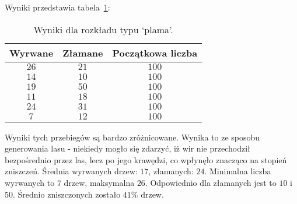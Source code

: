 Wyniki przedstawia tabela~\ref{tab:sym3}:

 \begin{table}[h!]
 \caption{Wyniki dla rozkładu typu `plama'.}
 \label{tab:sym3}
 \begin{center}
\begin{tabular} {|c|c|c|}
\hline
Wyrwane & Złamane & Początkowa liczba \\ \hline \hline
$26$ 	& $21$ 	&	$100$ \\ \hline
$14$ 	& $10$ 	&	$100$ \\ \hline
$19$ 	& $50$ 	&	$100$ \\ \hline
$11$ 	& $18$ 	&	$100$ \\ \hline
$24$ 	& $31$ 	&	$100$ \\ \hline
$7$ 	& $12$ 	&	$100$ \\ \hline
\end{tabular}
\end{center}
\end{table}

Wyniki tych przebiegów są bardzo zróżnicowane. Wynika to ze sposobu generowania lasu - niekiedy mogło się zdarzyć, iż wir nie przechodził bezpośrednio przez las, lecz po jego krawędzi, co wpłynęło znacząco na stopień zniszczeń. 
Średnia wyrwanych drzew: $17$, złamanych: $24$. Minimalna liczba wyrwanych to $7$ drzew, maksymalna $26$. Odpowiednio dla złamanych jest to $10$ i $50$.
Średnio zniszczonych zostało $41\%$ drzew.

